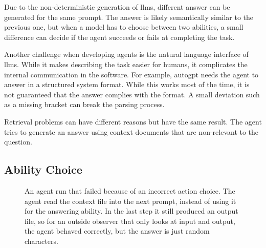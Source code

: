 \documentclass[../main.tex]{subfiles}
\begin{document}
Due to the non-deterministic generation of \glspl{llm},
different answer can be generated for the same prompt.
The answer is likely semantically similar to the previous one,
but when a model has to choose between two abilities,
a small difference can decide if the agent succeeds or fails at completing the task.

Another challenge when developing agents
is the natural language interface of \glspl{llm}.
While it makes describing the task easier for humans,
it complicates the internal communication in the software.
For example,
\gls{autogpt} needs the agent to answer in a structured system format.
While this works most of the time,
it is not guaranteed that the answer complies with the format.
A small deviation such as a missing bracket can break the parsing process.

Retrieval problems can have different reasons but have the same result.
The agent tries to generate an answer using context documents that are
non-relevant to the question.

\subsection{Ability Choice}

\begin{figure}[t]
      \centering
      \caption{An agent run that failed because of an incorrect action choice.
            The agent read the context file into the next prompt,
            instead of using it for the answering ability.
            In the last step it still produced an output file,
            so for an outside observer that only looks at input and output,
            the agent behaved correctly, but the answer is just random characters.}
      \label{fig:bad_agent_run}
\end{figure}
\end{document}
